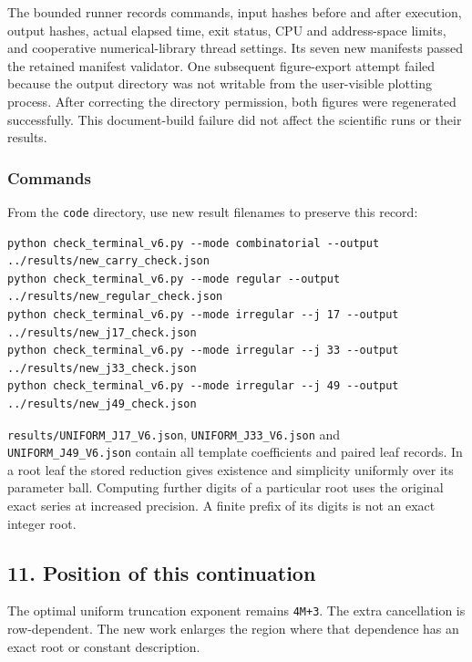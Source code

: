 \documentclass[11pt,letterpaper]{article}
\begin{document}
The bounded runner records commands, input hashes before and after execution, output hashes, actual elapsed time, exit status, CPU and address-space limits, and cooperative numerical-library thread settings. Its seven new manifests passed the retained manifest validator. One subsequent figure-export attempt failed because the output directory was not writable from the user-visible plotting process. After correcting the directory permission, both figures were regenerated successfully. This document-build failure did not affect the scientific runs or their results.

\subsubsection{Commands}\label{commands}

From the \texttt{code} directory, use new result filenames to preserve this record:

\begin{verbatim}
python check_terminal_v6.py --mode combinatorial --output ../results/new_carry_check.json
python check_terminal_v6.py --mode regular --output ../results/new_regular_check.json
python check_terminal_v6.py --mode irregular --j 17 --output ../results/new_j17_check.json
python check_terminal_v6.py --mode irregular --j 33 --output ../results/new_j33_check.json
python check_terminal_v6.py --mode irregular --j 49 --output ../results/new_j49_check.json
\end{verbatim}

\texttt{results/UNIFORM\_J17\_V6.json}, \texttt{UNIFORM\_J33\_V6.json} and \texttt{UNIFORM\_J49\_V6.json} contain all template coefficients and paired leaf records. In a root leaf the stored reduction gives existence and simplicity uniformly over its parameter ball. Computing further digits of a particular root uses the original exact series at increased precision. A finite prefix of its digits is not an exact integer root.

\subsection{11. Position of this continuation}\label{position-of-this-continuation}

The optimal uniform truncation exponent remains \texttt{4M+3}. The extra cancellation is row-dependent. The new work enlarges the region where that dependence has an exact root or constant description.
\end{document}
